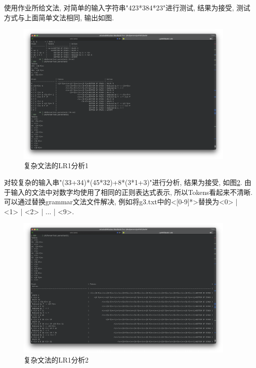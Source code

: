 使用作业所给文法, 对简单的输入字符串"423*384*23"进行测试, 结果为接受,
测试方式与上面简单文法相同, 输出如图.
\begin{figure}[ht!]
	\begin{center}
		\includegraphics[width=0.95\textwidth]{figures/lr1复杂分析1.png}
	\end{center}
	\caption{复杂文法的LR1分析1}
	\label{fig:复杂文法的LR1分析1}
\end{figure}

对较复杂的输入串"(33+34)*(45*32)+8*(3*1+3)"进行分析, 结果为接受,
如图\ref{fig:复杂文法的LR1分析2}.
由于输入的文法中对数字均使用了相同的正则表达式表示, 所以Tokens看起来不清晰.
可以通过替换grammar文法文件解决, 例如将g3.txt中的<[0-9]*>替换为<0> | <1> | <2> |
... | <9>.

\begin{figure}[ht!]
	\begin{center}
		\includegraphics[width=0.95\textwidth]{figures/lr1复杂分析2.png}
	\end{center}
	\caption{复杂文法的LR1分析2}
	\label{fig:复杂文法的LR1分析2}
\end{figure}

